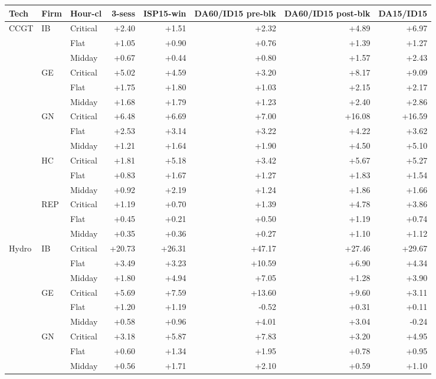 \begin{tabular}{l l l r r r r r }
\toprule
Tech & Firm & Hour-cl & 3-sess & ISP15-win & DA60/ID15 pre-blk & DA60/ID15 post-blk & DA15/ID15 \\
\midrule
CCGT & IB & Critical & +2.40 & +1.51 & +2.32 & +4.89 & +6.97 \\
 &  & Flat & +1.05 & +0.90 & +0.76 & +1.39 & +1.27 \\
 &  & Midday & +0.67 & +0.44 & +0.80 & +1.57 & +2.43 \\
 & GE & Critical & +5.02 & +4.59 & +3.20 & +8.17 & +9.09 \\
 &  & Flat & +1.75 & +1.80 & +1.03 & +2.15 & +2.17 \\
 &  & Midday & +1.68 & +1.79 & +1.23 & +2.40 & +2.86 \\
 & GN & Critical & +6.48 & +6.69 & +7.00 & +16.08 & +16.59 \\
 &  & Flat & +2.53 & +3.14 & +3.22 & +4.22 & +3.62 \\
 &  & Midday & +1.21 & +1.64 & +1.90 & +4.50 & +5.10 \\
 & HC & Critical & +1.81 & +5.18 & +3.42 & +5.67 & +5.27 \\
 &  & Flat & +0.83 & +1.67 & +1.27 & +1.83 & +1.54 \\
 &  & Midday & +0.92 & +2.19 & +1.24 & +1.86 & +1.66 \\
 & REP & Critical & +1.19 & +0.70 & +1.39 & +4.78 & +3.86 \\
 &  & Flat & +0.45 & +0.21 & +0.50 & +1.19 & +0.74 \\
 &  & Midday & +0.35 & +0.36 & +0.27 & +1.10 & +1.12 \\
\addlinespace
Hydro & IB & Critical & +20.73 & +26.31 & +47.17 & +27.46 & +29.67 \\
 &  & Flat & +3.49 & +3.23 & +10.59 & +6.90 & +4.34 \\
 &  & Midday & +1.80 & +4.94 & +7.05 & +1.28 & +3.90 \\
 & GE & Critical & +5.69 & +7.59 & +13.60 & +9.60 & +3.11 \\
 &  & Flat & +1.20 & +1.19 & -0.52 & +0.31 & +0.11 \\
 &  & Midday & +0.58 & +0.96 & +4.01 & +3.04 & -0.24 \\
 & GN & Critical & +3.18 & +5.87 & +7.83 & +3.20 & +4.95 \\
 &  & Flat & +0.60 & +1.34 & +1.95 & +0.78 & +0.95 \\
 &  & Midday & +0.56 & +1.71 & +2.10 & +0.59 & +1.10 \\

\end{tabular}
